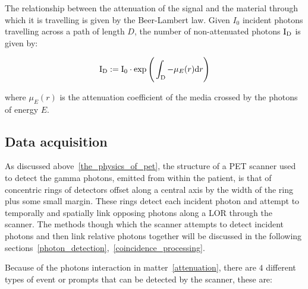                 The relationship between the attenuation of the signal and the material through which it is travelling is given by the Beer-Lambert law. Given $I_0$ incident photons travelling across a path of length $D$, the number of non-attenuated photons $\mathrm{I}_{\mathrm{D}}$ is given by:
                 
                \begin{equation} \label{eq:beer_lambert_law}
                    \mathrm{I}_{\mathrm{D}} := \mathrm{I}_{0} \cdot \exp\Bigg(\int_{\mathrm{D}} - \mu_E(r)\mathrm{d} r \Bigg)
                \end{equation}

                \noindent where $\mu_E(r)$ is the attenuation coefficient of the media crossed by the photons of energy $E$.
        
        \subsection{Data acquisition} \label{data_acquisition}
            
            As discussed above~\ref{the_physics_of_pet}, the structure of a \gls{PET} scanner used to detect the gamma photons, emitted from within the patient, is that of concentric rings of detectors offset along a central axis by the width of the ring plus some small margin. These rings detect each incident photon and attempt to temporally and spatially link opposing photons along a \gls{LOR} through the scanner. The methods though which the scanner attempts to detect incident photons and then link relative photons together will be discussed in the following sections~\ref{photon_detection},~\ref{coincidence_processing}.
            
            Because of the photons interaction in matter~\ref{attenuation}, there are $4$ different types of event or prompts that can be detected by the scanner, these are:
            
